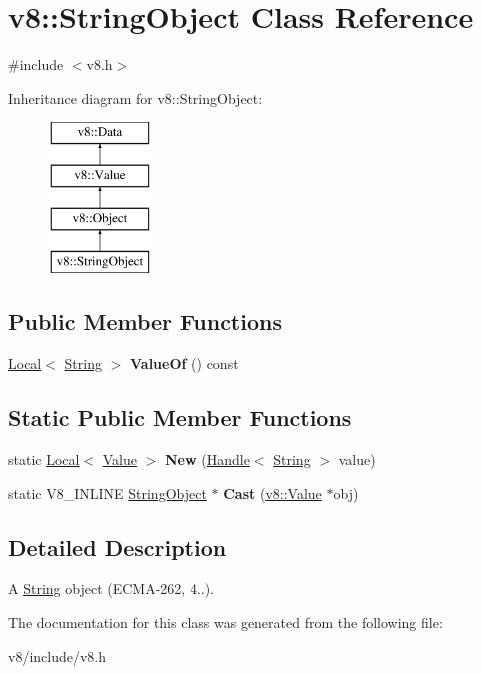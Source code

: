 \hypertarget{classv8_1_1StringObject}{}\section{v8\+:\+:String\+Object Class Reference}
\label{classv8_1_1StringObject}


{\ttfamily \#include $<$v8.\+h$>$}

Inheritance diagram for v8\+:\+:String\+Object\+:\begin{figure}[H]
\begin{center}
\leavevmode
\includegraphics[height=4.000000cm]{classv8_1_1StringObject}
\end{center}
\end{figure}
\subsection*{Public Member Functions}
\begin{DoxyCompactItemize}
\item 
\hypertarget{classv8_1_1StringObject_a96bd6c736a0272ab7e683038953077e4}{}\hyperlink{classv8_1_1Local}{Local}$<$ \hyperlink{classv8_1_1String}{String} $>$ {\bfseries Value\+Of} () const \label{classv8_1_1StringObject_a96bd6c736a0272ab7e683038953077e4}

\end{DoxyCompactItemize}
\subsection*{Static Public Member Functions}
\begin{DoxyCompactItemize}
\item 
\hypertarget{classv8_1_1StringObject_a299c1d30b32e8bc336c8af05471a0763}{}static \hyperlink{classv8_1_1Local}{Local}$<$ \hyperlink{classv8_1_1Value}{Value} $>$ {\bfseries New} (\hyperlink{classv8_1_1Handle}{Handle}$<$ \hyperlink{classv8_1_1String}{String} $>$ value)\label{classv8_1_1StringObject_a299c1d30b32e8bc336c8af05471a0763}

\item 
\hypertarget{classv8_1_1StringObject_af2169f0b4c890196416e4d28fbf76df8}{}static V8\+\_\+\+I\+N\+L\+I\+N\+E \hyperlink{classv8_1_1StringObject}{String\+Object} $\ast$ {\bfseries Cast} (\hyperlink{classv8_1_1Value}{v8\+::\+Value} $\ast$obj)\label{classv8_1_1StringObject_af2169f0b4c890196416e4d28fbf76df8}

\end{DoxyCompactItemize}


\subsection{Detailed Description}
A \hyperlink{classv8_1_1String}{String} object (E\+C\+M\+A-\/262, 4..). 

The documentation for this class was generated from the following file\+:\begin{DoxyCompactItemize}
\item 
v8/include/v8.\+h\end{DoxyCompactItemize}
